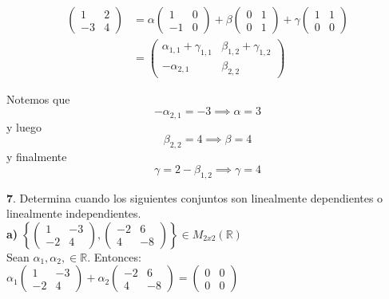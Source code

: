 \documentclass[letterpaper]{article}
\renewcommand{\*}{\cdot}
\theoremstyle{definition}
\begin{document}
\begin{align*}
 \begin{pmatrix} 
 1 & 2 \\ 
 -3 & 4 
 \end{pmatrix} &= \alpha \begin{pmatrix} 
 1 & 0 \\ 
 -1 & 0 
 \end{pmatrix}  + \beta \begin{pmatrix} 
 0 & 1 \\
 0 &1 
 \end{pmatrix}  + \gamma  \begin{pmatrix} 
 1 & 1 \\
 0 &0 
 \end{pmatrix} \\
  & = \begin{pmatrix} \alpha_{1,1}  + \gamma_{1,1} & \beta_{1,2} + \gamma_{1,2} \\ -\alpha_{2,1} & \beta_{2,2} \end{pmatrix}  
\end{align*}

Notemos que $$ -\alpha_{2,1} = -3  \implies  \alpha = 3$$ y luego 
$$\beta_{2,2} = 4 \implies \beta = 4 $$ y finalmente $$\gamma = 2 - \beta_{1,2} \implies \gamma = 4 $$

\noindent \textbf{7}. Determina cuando los siguientes conjuntos son linealmente dependientes o linealmente independientes. \\
  
\textbf{a)} $\left \lbrace \begin{pmatrix} 1 & -3 \\ -2 & 4 \end{pmatrix} , \begin{pmatrix} -2 & 6 \\ 4 & -8 \end{pmatrix} \right \rbrace \in M_{2x2}(\mathbb{R})$\\

Sean $\alpha _1, \alpha _2, \in \mathbb{R}$. Entonces:\\

$\alpha_1 \begin{pmatrix} 1 & -3 \\ -2 & 4 \end{pmatrix}  + \alpha_2 \begin{pmatrix} -2 & 6 \\ 4 & -8 \end{pmatrix} = \begin{pmatrix}
0 & 0 \\ 0 & 0 \end{pmatrix}$\\
\end{document}
